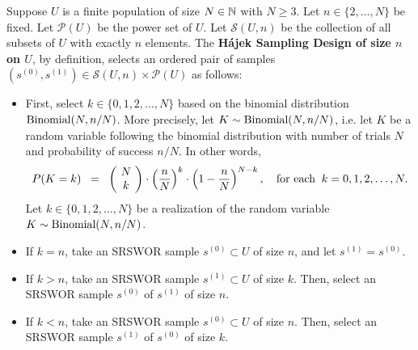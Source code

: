\begin{definition}
\label{HajekSamplingDesign}
\mbox{}
\vskip 0.1cm
\noindent
Suppose $U$ is a finite population of size $N \in \mathbb{N}$ with $N \geq 3$.
Let $n \in \{2,\ldots,N\}$ be fixed.
Let $\mathcal{P}(U)$ be the power set of $U$.
Let $\mathcal{S}(U,n)$ be the collection of all subsets of $U$ with exactly $n$ elements. 
The \textbf{H\'ajek Sampling Design of size $n$ on $U$},
by definition, selects an ordered pair of samples $\left(s^{(0)}, s^{(1)}\right) \in \mathcal{S}(U,n) \times \mathcal{P}(U)$ as follows:
\begin{itemize}

\item	First, select $k \in \{0,1,2,\ldots,N\}$ based on the binomial distribution $\textnormal{Binomial}(N,n/N)$.
\vskip 0.1cm
More precisely, let $K \sim \textnormal{Binomial}(N,n/N)$, i.e. let $K$ be a random variable following the binomial distribution with number of trials $N$ and probability of success $n/N$. In other words,
\begin{equation*}
P(K=k) \;\;=\;\; \left(\!\begin{array}{c} N \\ k \end{array}\!\right) \cdot \left(\dfrac{n}{N}\right)^{k} \cdot \left(1 - \dfrac{n}{N}\right)^{N-k},
\quad\textnormal{for each}\;\; k = 0, 1, 2, \ldots, N.
\end{equation*}
Let $k \in \{0,1,2,\ldots,N\}$ be a realization of the random variable $K \sim \textnormal{Binomial}(N,n/N)$.

\item	If $k = n$, take an SRSWOR sample $s^{(0)} \subset U$ of size $n$, and let $s^{(1)} = s^{(0)}$.

\item	If $k > n$, take an SRSWOR sample $s^{(1)} \subset U$ of size $k$.
		Then, select an SRSWOR sample $s^{(0)}$ of $s^{(1)}$ of size $n$.

\item	If $k < n$, take an SRSWOR sample $s^{(0)} \subset U$ of size $n$.
		Then, select an SRSWOR sample $s^{(1)}$ of $s^{(0)}$ of size $k$.
\end{itemize}
\end{definition}

